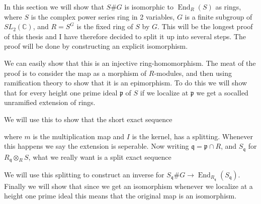 \documentclass[11pt, a4paper, english]{article}
\numberwithin{prop}{section}
\numberwithin{lemma}{section}
\numberwithin{theorem}{section}
\numberwithin{defin}{section}
\numberwithin{example}{section}
\newcommand{\C}{\mathbb{C}}
\DeclareMathOperator{\End}{End}
\begin{document}
In this section we will show that $S\#G$ is isomorphic to $\End_R(S)$ as rings, where $S$ is the complex power series ring in 2 variables, $G$ is a finite subgroup of $SL_2(\C)$, and $R = S^G$ is the fixed ring of $S$ by $G$. This will be the longest proof of this thesis and I have therefore decided to split it up into several steps. The proof will be done by constructing an explicit isomorphism.
\begin{center}
\end{center}
We can easily show that this is an injective ring-homomorphism. The meat of the proof is to consider the map as a morphism of $R$-modules, and then using ramification theory to show that it is an epimorphism. To do this we will show that for every height one prime ideal $\mathfrak{p}$ of $S$ if we localize at $\mathfrak{p}$ we get a socalled unramified extension of rings.
\begin{center}
\end{center}
We will use this to show that the short exact sequence
\begin{center}
\end{center}
where $m$ is the multiplication map and $I$ is the kernel, has a splitting. Whenever this happens we say the extension is seperable. Now writing $\mathfrak{q} = \mathfrak{p} \cap R$, and $S_\mathfrak{q}$ for $R_\mathfrak{q} \otimes_R S$, what we really want is a split exact sequence
\begin{center}
\end{center}
We will use this splitting to construct an inverse for $S_\mathfrak{q}\#G \to \End_{R_{\mathfrak{q}}}(S_\mathfrak{q})$. Finally we will show that since we get an isomorphism whenever we localize at a height one prime ideal this means that the original map is an isomorphism.
\end{document}
